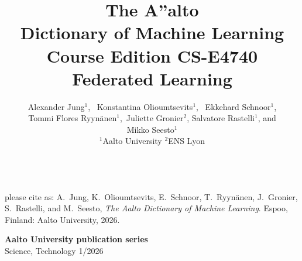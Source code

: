 \documentclass[journal,12pt,onecolumn]{article}
\begin{document}
\pagestyle{empty}

\title {\vspace*{10mm}
	{\huge {\bf The {\fontsize{40}{48}\selectfont \textbf{\textsf{A\hspace*{-2mm}''}}}\hspace*{-4mm}alto \\[-2mm] Dictionary of Machine Learning}}  \\[-2mm] 
		{\Large {\bf Course Edition CS-E4740 Federated Learning}}  \\[-5mm] 
}


\author{\hspace{-2mm}Alexander Jung${}^{1}$, \ Konstantina Olioumtsevits${}^{1}$, \ 
	Ekkehard Schnoor${}^{1}$, \\[-2mm] Tommi Flores Ryynänen${}^{1}$,\ 
	Juliette Gronier${}^{2}$, Salvatore Rastelli${}^{1}$, and \\[-2mm] Mikko Seesto${}^{1}$ \\[-2mm]
	${}^{1}$Aalto University \quad ${}^{2}$ENS Lyon
}

\maketitle
\thispagestyle{empty}
	\begin{center}
		\\[10mm]
{\large	please cite as: A.\ Jung, K.\ Olioumtsevits, E.\ Schnoor, T.\ Ryynänen, J.\ Gronier, S.\ Rastelli, and M.\ Seesto, \textit{The Aalto Dictionary of Machine Learning}. Espoo, Finland: Aalto University, 2026.}
\end{center}

\newpage
\thispagestyle{empty}

\vspace*{20mm}

\begin{center}
	\textbf{Aalto University publication series}\\[2mm]
	Science, Technology 1/2026
\end{center}
\end{document}
